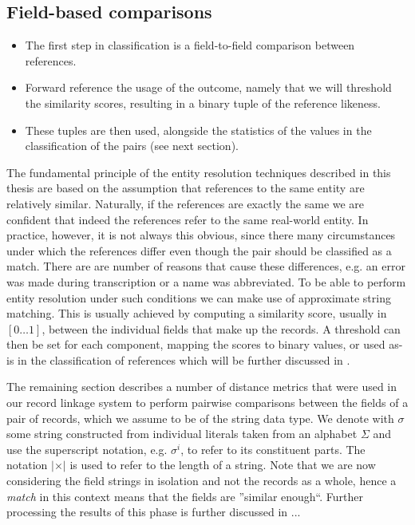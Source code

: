 \documentclass[paper=a4, fontsize=11pt]{scrartcl}
\begin{document}
\subsection{Field-based comparisons}
\begin{itemize}
    \item The first step in classification is a field-to-field comparison between references.
    \item Forward reference the usage of the outcome, namely that we will threshold the similarity scores, resulting in a binary tuple of the reference likeness.
    \item These tuples are then used, alongside the statistics of the values in the classification of the pairs (see next section).
\end{itemize}

The fundamental principle of the entity resolution techniques described in this thesis are based on the assumption that references to the same entity are relatively similar.
Naturally, if the references are exactly the same we are confident that indeed the references refer to the same real-world entity.
In practice, however, it is not always this obvious, since there many circumstances under which the references differ even though the pair should be classified as a match.
There are are number of reasons that cause these differences, e.g. an error was made during transcription or a name was abbreviated.
To be able to perform entity resolution under such conditions we can make use of approximate string matching.
This is usually achieved by computing a similarity score, usually in $[0 \dots 1]$, between the individual fields that make up the records.
A threshold can then be set for each component, mapping the scores to binary values, or used as-is in the classification of references which will be further discussed in .

The remaining section describes a number of distance metrics that were used in our record linkage system to perform pairwise comparisons between the fields of a pair of records, which we assume to be of the string data type.
We denote with $\sigma$ some string constructed from individual literals taken from an alphabet $\Sigma$ and use the superscript notation, e.g. $\sigma^{i}$, to refer to its constituent parts.
The notation $\vert \times \vert$ is used to refer to the length of a string.
Note that we are now considering the field strings in isolation and not the records as a whole, hence a \emph{match} in this context means that the fields are ''similar enough``.
Further processing the results of this phase is further discussed in ...
\end{document}
